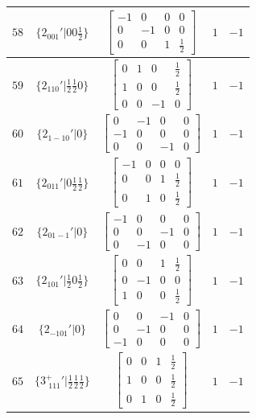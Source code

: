 \documentclass[fleqn,8pt]{jsarticle}
\begin{document}
\begin{longtable}{ccccc}
$ 58 $ & $ \{2{}_{001}{}'|0 0 \frac{1}{2}\} $ & $ \begin{bmatrix} -1 & 0 & 0 & 0 \\ 0 & -1 & 0 & 0 \\ 0 & 0 & 1 & \frac{1}{2} \end{bmatrix} $ & $ 1 $ & $ -1 $ \\ \hline
$ 59 $ & $ \{2{}_{110}{}'|\frac{1}{2} \frac{1}{2} 0\} $ & $ \begin{bmatrix} 0 & 1 & 0 & \frac{1}{2} \\ 1 & 0 & 0 & \frac{1}{2} \\ 0 & 0 & -1 & 0 \end{bmatrix} $ & $ 1 $ & $ -1 $ \\ \hline
$ 60 $ & $ \{2{}_{1-10}{}'|0\} $ & $ \begin{bmatrix} 0 & -1 & 0 & 0 \\ -1 & 0 & 0 & 0 \\ 0 & 0 & -1 & 0 \end{bmatrix} $ & $ 1 $ & $ -1 $ \\ \hline
$ 61 $ & $ \{2{}_{011}{}'|0 \frac{1}{2} \frac{1}{2}\} $ & $ \begin{bmatrix} -1 & 0 & 0 & 0 \\ 0 & 0 & 1 & \frac{1}{2} \\ 0 & 1 & 0 & \frac{1}{2} \end{bmatrix} $ & $ 1 $ & $ -1 $ \\ \hline
$ 62 $ & $ \{2{}_{01-1}{}'|0\} $ & $ \begin{bmatrix} -1 & 0 & 0 & 0 \\ 0 & 0 & -1 & 0 \\ 0 & -1 & 0 & 0 \end{bmatrix} $ & $ 1 $ & $ -1 $ \\ \hline
$ 63 $ & $ \{2{}_{101}{}'|\frac{1}{2} 0 \frac{1}{2}\} $ & $ \begin{bmatrix} 0 & 0 & 1 & \frac{1}{2} \\ 0 & -1 & 0 & 0 \\ 1 & 0 & 0 & \frac{1}{2} \end{bmatrix} $ & $ 1 $ & $ -1 $ \\ \hline
$ 64 $ & $ \{2{}_{-101}{}'|0\} $ & $ \begin{bmatrix} 0 & 0 & -1 & 0 \\ 0 & -1 & 0 & 0 \\ -1 & 0 & 0 & 0 \end{bmatrix} $ & $ 1 $ & $ -1 $ \\ \hline
$ 65 $ & $ \{3^{+}_{\,\,111}{}'|\frac{1}{2} \frac{1}{2} \frac{1}{2}\} $ & $ \begin{bmatrix} 0 & 0 & 1 & \frac{1}{2} \\ 1 & 0 & 0 & \frac{1}{2} \\ 0 & 1 & 0 & \frac{1}{2} \end{bmatrix} $ & $ 1 $ & $ -1 $ \\ \hline

\end{longtable}
\end{document}
